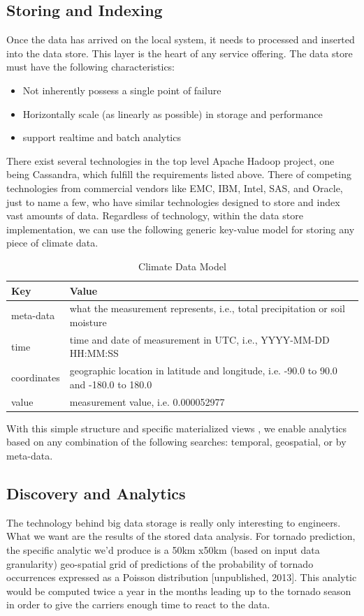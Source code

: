 \subsection*{Storing and Indexing}
Once the data has arrived on the local system, it needs to processed and inserted into the data store. This layer is the heart of any service offering. The data store must have the following characteristics:
\begin{itemize}
	\item Not inherently possess a single point of failure
	\item Horizontally scale (as linearly as possible) in storage and performance
	\item support realtime and batch analytics
\end{itemize}
There exist several technologies in the top level Apache Hadoop project, one being Cassandra, which fulfill the requirements listed above\cite{cassandra}. There of competing technologies from commercial vendors like EMC, IBM, Intel, SAS, and Oracle, just to name a few, who have similar technologies designed to store and index vast amounts of data. Regardless of technology, within the data store implementation, we can use the following generic key-value model for storing any piece of climate data.
\begin{table}[htbp]
	\caption*{Climate Data Model}
	\centering
	\begin{tabular}{l l}
		\hline
		Key & Value \\ [0.5ex]
		\hline
		meta-data & what the measurement represents, i.e., total precipitation or soil moisture\\
		time & time and date of measurement in UTC, i.e., YYYY-MM-DD HH:MM:SS\\
		coordinates & geographic location in latitude and longitude, i.e. -90.0 to 90.0 and -180.0 to 180.0\\
		value & measurement value, i.e. 0.000052977\\
		\hline
	\end{tabular}
\end{table}
With this simple structure and specific materialized views \cite{materialized_views}, we enable analytics based on any combination of the following searches: temporal, geospatial, or by meta-data.

\subsection*{Discovery and Analytics}
The technology behind big data storage is really only interesting to engineers. What we want are the results of the stored data analysis. For tornado prediction, the specific analytic we'd produce is a 50km x50km (based on input data granularity) geo-spatial grid of predictions of the probability of tornado occurrences expressed as a Poisson distribution [unpublished, 2013]. This analytic would be computed twice a year in the months leading up to the tornado season in order to give the carriers enough time to react to the data.

